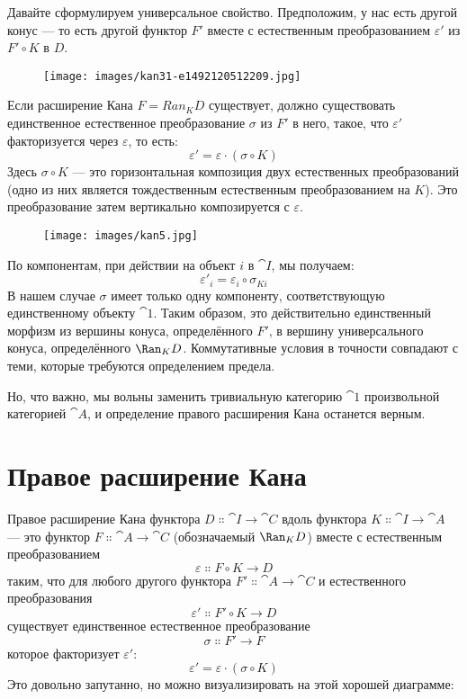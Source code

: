 Давайте сформулируем универсальное свойство. Предположим, у нас есть другой конус ---
то есть другой функтор $F'$ вместе с естественным
преобразованием $\varepsilon'$ из $F' \circ K$ в
$D$.

\begin{figure}[H]
  \centering
  \texttt{[image: images/kan31-e1492120512209.jpg]}
\end{figure}

\noindent
Если расширение Кана $F = Ran_{K}D$ существует, должно существовать единственное
естественное преобразование $\sigma$ из $F'$ в него, такое,
что $\varepsilon'$ факторизуется через $\varepsilon$, то есть:
\[\varepsilon' = \varepsilon \cdot (\sigma \circ K)\]
Здесь $\sigma \circ K$ — это горизонтальная композиция двух естественных
преобразований (одно из них является тождественным естественным преобразованием
на $K$). Это преобразование затем вертикально композируется с
$\varepsilon$.

\begin{figure}[H]
  \centering
  \texttt{[image: images/kan5.jpg]}
\end{figure}

\noindent
По компонентам, при действии на объект $i$ в $\cat{I}$, мы получаем:
\[\varepsilon'_i = \varepsilon_i \circ \sigma_{K i}\]
В нашем случае $\sigma$ имеет только одну компоненту, соответствующую
единственному объекту $\cat{1}$. Таким образом, это действительно единственный морфизм
из вершины конуса, определённого $F'$, в вершину
универсального конуса, определённого $\Ran_{K}D$. Коммутативные условия
в точности совпадают с теми, которые требуются определением предела.

Но, что важно, мы вольны заменить тривиальную категорию $\cat{1}$
произвольной категорией $\cat{A}$, и определение правого расширения
Кана останется верным.

\section{Правое расширение Кана}

Правое расширение Кана функтора $D \Colon \cat{I} \to \cat{C}$
вдоль функтора $K \Colon \cat{I} \to \cat{A}$ — это функтор
$F \Colon \cat{A} \to \cat{C}$ (обозначаемый $\Ran_{K}D$) вместе с
естественным преобразованием
\[\varepsilon \Colon F \circ K \to D\]
таким, что для любого другого функтора $F' \Colon \cat{A} \to \cat{C}$ и
естественного преобразования
\[\varepsilon' \Colon F' \circ K \to D\]
существует единственное естественное преобразование
\[\sigma \Colon F' \to F\]
которое факторизует $\varepsilon'$:
\[\varepsilon' = \varepsilon \cdot (\sigma \circ K)\]
Это довольно запутанно, но можно визуализировать на этой хорошей диаграмме:


